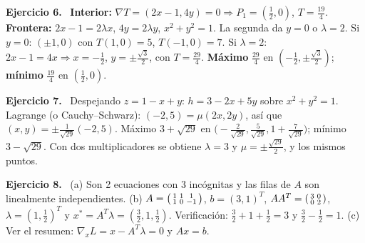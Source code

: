 \documentclass[11pt,a4paper]{article}
\newcommand{\sol}[1]{\par\medskip\noindent\textbf{Ejercicio #1.}\ }
\begin{document}
\sol{6}
\textbf{Interior:} $\nabla T=(2x-1,4y)=0\Rightarrow P_1=(\tfrac12,0)$, $T=\tfrac{19}4$. \textbf{Frontera:} $2x-1=2\lambda x$, $4y=2\lambda y$, $x^2+y^2=1$. La segunda da $y=0$ o $\lambda=2$.
Si $y=0$: $(\pm1,0)$ con $T(1,0)=5$, $T(-1,0)=7$. Si $\lambda=2$: $2x-1=4x\Rightarrow x=-\tfrac12$, $y=\pm\tfrac{\sqrt3}2$, con $T=\tfrac{29}4$.
\textbf{Máximo} $\tfrac{29}4$ en $(-\tfrac12,\pm\tfrac{\sqrt3}2)$; \textbf{mínimo} $\tfrac{19}4$ en $(\tfrac12,0)$.

\sol{7}
Despejando $z=1-x+y$: $h=3-2x+5y$ sobre $x^2+y^2=1$. Lagrange (o Cauchy--Schwarz): $(-2,5)=\mu(2x,2y)$, así que $(x,y)=\pm\tfrac{1}{\sqrt{29}}(-2,5)$. Máximo $3+\sqrt{29}$ en $\big(-\tfrac2{\sqrt{29}},\tfrac5{\sqrt{29}},1+\tfrac7{\sqrt{29}}\big)$; mínimo $3-\sqrt{29}$. Con dos multiplicadores se obtiene $\lambda=3$ y $\mu=\pm\tfrac{\sqrt{29}}2$, y los mismos puntos.

\sol{8}
(a) Son 2 ecuaciones con 3 incógnitas y las filas de $A$ son linealmente independientes. (b) $A=\begin{psmallmatrix}1&1&1\\1&0&-1\end{psmallmatrix}$, $b=(3,1)^T$, $AA^T=\begin{psmallmatrix}3&0\\0&2\end{psmallmatrix}$, $\lambda=(1,\tfrac12)^T$ y $x^*=A^T\lambda=(\tfrac32,1,\tfrac12)$. Verificación: $\tfrac32+1+\tfrac12=3$ y $\tfrac32-\tfrac12=1$. (c) Ver el resumen: $\nabla_xL=x-A^T\lambda=0$ y $Ax=b$.
\end{document}

